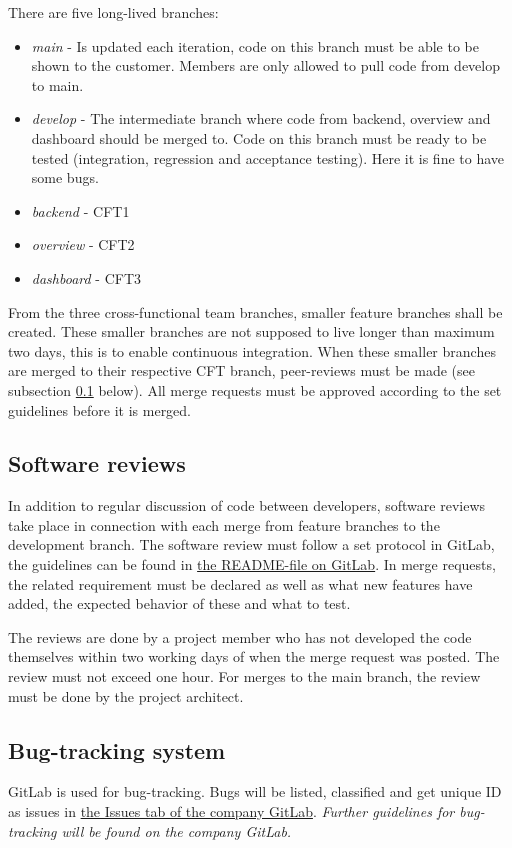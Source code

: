 \noindent There are five long-lived branches:
\begin{itemize}
\item \emph{main} - Is updated each iteration, code on this branch must be able to be shown to the customer. Members are only allowed to pull code from develop to main.
\item \emph{develop} - The intermediate branch where code from backend, overview and dashboard should be merged to. Code on this branch must be ready to be tested (integration, regression and acceptance testing). Here it is fine to have some bugs.
\item \emph{backend} - CFT1
\item \emph{overview} - CFT2
\item \emph{dashboard} - CFT3
\end{itemize}

\noindent From the three cross-functional team branches, smaller feature branches shall be created. These smaller branches are not supposed to live longer than maximum two days, this is to enable continuous integration. When these smaller branches are merged to their respective CFT branch, peer-reviews must be made (see subsection \ref{subsec:reviews} below). 
All merge requests must be approved according to the set guidelines before it is merged.

\subsection{Software reviews}
\label{subsec:reviews}
In addition to regular discussion of code between developers, software reviews take place in connection with each merge from feature branches to the development branch. The software review must follow a set protocol in GitLab, the guidelines can be found in \href{https://gitlab.liu.se/tddc88-company-1-2021/deploy/-/blob/develop/README.md}{the README-file on GitLab}. In merge requests, the related requirement must be declared as well as what new features have added, the expected behavior of these and what to test.

The reviews are done by a project member who has not developed the code themselves within two working days of when the merge request was posted. The review must not exceed one hour. For merges to the main branch, the review must be done by the project architect.

\subsection{Bug-tracking system}
GitLab is used for bug-tracking. Bugs will be listed, classified and get unique ID as issues in \href{https://gitlab.liu.se/tddc88-company-1-2021/deploy/-/issues}{the Issues tab of the company GitLab}. \emph{Further guidelines for bug-tracking will be found on the company GitLab.}

